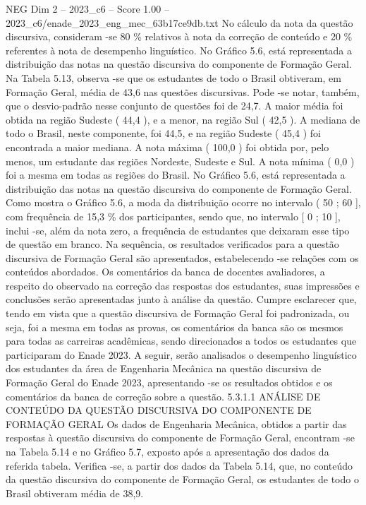 \begin{textsample}{NEG Dim 2 – 2023\_c6 – Score 1.00 – 2023\_c6/enade\_2023\_eng\_mec\_63b17ce9db.txt}
No cálculo da nota da questão discursiva, consideram -se 80 \% relativos à nota da correção de conteúdo e 20 \% referentes à nota de desempenho linguístico.
No Gráfico 5.6, está representada a distribuição das notas na questão discursiva do componente de Formação Geral.
Na Tabela 5.13, observa -se que os estudantes de todo o Brasil obtiveram, em Formação Geral, média de 43,6 nas questões discursivas.
Pode -se notar, também, que o desvio-padrão nesse conjunto de questões foi de 24,7.
A maior média foi obtida na região Sudeste ( 44,4 ), e a menor, na região Sul ( 42,5 ).
A mediana de todo o Brasil, neste componente, foi 44,5, e na região Sudeste ( 45,4 ) foi encontrada a maior mediana.
A nota máxima ( 100,0 ) foi obtida por, pelo menos, um estudante das regiões Nordeste, Sudeste e Sul.
A nota mínima ( 0,0 ) foi a mesma em todas as regiões do Brasil.
No Gráfico 5.6, está representada a distribuição das notas na questão discursiva do componente de Formação Geral.
Como mostra o Gráfico 5.6, a moda da distribuição ocorre no intervalo ( 50 ; 60 ], com frequência de 15,3 \% dos participantes, sendo que, no intervalo [ 0 ; 10 ], inclui -se, além da nota zero, a frequência de estudantes que deixaram esse tipo de questão em branco.
Na sequência, os resultados verificados para a questão discursiva de Formação Geral são apresentados, estabelecendo -se relações com os conteúdos abordados.
Os comentários da banca de docentes avaliadores, a respeito do observado na correção das respostas dos estudantes, suas impressões e conclusões serão apresentadas junto à análise da questão.
Cumpre esclarecer que, tendo em vista que a questão discursiva de Formação Geral foi padronizada, ou seja, foi a mesma em todas as provas, os comentários da banca são os mesmos para todas as carreiras acadêmicas, sendo direcionados a todos os estudantes que participaram do Enade 2023.
A seguir, serão analisados o desempenho linguístico dos estudantes da área de Engenharia Mecânica na questão discursiva de Formação Geral do Enade 2023, apresentando -se os resultados obtidos e os comentários da banca de correção sobre a questão. 5.3.1.1 ANÁLISE DE CONTEÚDO DA QUESTÃO DISCURSIVA DO COMPONENTE DE FORMAÇÃO GERAL Os dados de Engenharia Mecânica, obtidos a partir das respostas à questão discursiva do componente de Formação Geral, encontram -se na Tabela 5.14 e no Gráfico 5.7, exposto após a apresentação dos dados da referida tabela.
Verifica -se, a partir dos dados da Tabela 5.14, que, no conteúdo da questão discursiva do componente de Formação Geral, os estudantes de todo o Brasil obtiveram média de 38,9.

\end{textsample}
